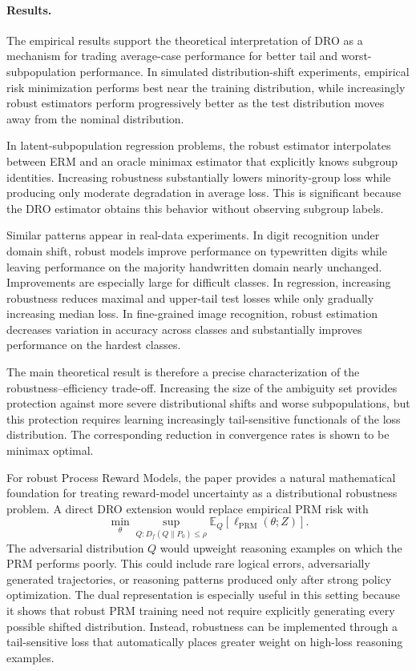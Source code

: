 \documentclass[11pt]{article}
\begin{document}
\paragraph{Results.}

The empirical results support the theoretical interpretation of DRO as a mechanism for trading average-case performance for better tail and worst-subpopulation performance. In simulated distribution-shift experiments, empirical risk minimization performs best near the training distribution, while increasingly robust estimators perform progressively better as the test distribution moves away from the nominal distribution.

In latent-subpopulation regression problems, the robust estimator interpolates between ERM and an oracle minimax estimator that explicitly knows subgroup identities. Increasing robustness substantially lowers minority-group loss while producing only moderate degradation in average loss. This is significant because the DRO estimator obtains this behavior without observing subgroup labels.

Similar patterns appear in real-data experiments. In digit recognition under domain shift, robust models improve performance on typewritten digits while leaving performance on the majority handwritten domain nearly unchanged. Improvements are especially large for difficult classes. In regression, increasing robustness reduces maximal and upper-tail test losses while only gradually increasing median loss. In fine-grained image recognition, robust estimation decreases variation in accuracy across classes and substantially improves performance on the hardest classes.

The main theoretical result is therefore a precise characterization of the robustness--efficiency trade-off. Increasing the size of the ambiguity set provides protection against more severe distributional shifts and worse subpopulations, but this protection requires learning increasingly tail-sensitive functionals of the loss distribution. The corresponding reduction in convergence rates is shown to be minimax optimal.

For robust Process Reward Models, the paper provides a natural mathematical foundation for treating reward-model uncertainty as a distributional robustness problem. 
A direct DRO extension would replace empirical PRM risk with
\[
\min_{\theta}
\sup_{Q:
D_f(Q\|P_0)\leq\rho}
\mathbb{E}_{Q}
\left[
\ell_{\mathrm{PRM}}(\theta;Z)
\right].
\]
The adversarial distribution \(Q\) would upweight reasoning examples on which the PRM performs poorly. This could include rare logical errors, adversarially generated trajectories, or reasoning patterns produced only after strong policy optimization.
The dual representation is especially useful in this setting because it shows that robust PRM training need not require explicitly generating every possible shifted distribution. Instead, robustness can be implemented through a tail-sensitive loss that automatically places greater weight on high-loss reasoning examples.
\end{document}
